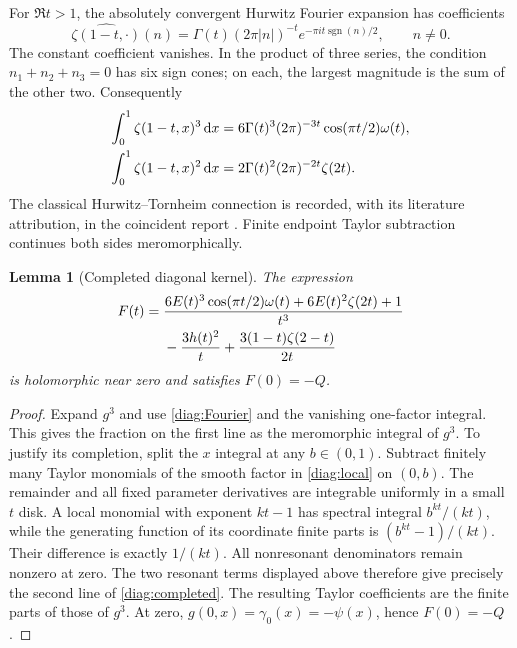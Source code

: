 \documentclass[11pt]{article}
\numberwithin{equation}{section}
\newtheorem{lemma}[theorem]{Lemma}
\theoremstyle{definition}
\theoremstyle{remark}
\newcommand{\dd}{\,\mathrm d}
\begin{document}
For $\Re t>1$, the absolutely convergent Hurwitz Fourier expansion
has coefficients
\[
 \widehat{\zeta(1-t,\cdot)}(n)
 =\Gamma(t)(2\pi|n|)^{-t}
             e^{-\pi i t\operatorname{sgn}(n)/2},\qquad n\ne0.
\]
The constant coefficient vanishes. In the product of three series,
the condition $n_1+n_2+n_3=0$ has six sign cones; on each, the
largest magnitude is the sum of the other two. Consequently
\begin{align}
 \int_0^1\zeta(1-t,x)^3\dd x
 &=6\Gamma(t)^3(2\pi)^{-3t}\cos(\pi t/2)\omega(t),\notag\\
 \int_0^1\zeta(1-t,x)^2\dd x
 &=2\Gamma(t)^2(2\pi)^{-2t}\zeta(2t).
 \label{diag:Fourier}
\end{align}
The classical Hurwitz--Tornheim connection is recorded, with its
literature attribution, in the coincident report
\cite{IncomingCoincident}. Finite endpoint Taylor subtraction
continues both sides meromorphically.

\begin{lemma}[Completed diagonal kernel]\label{lem:diag-completed}
The expression
\begin{align}
 F(t)={}&\frac{6E(t)^3\cos(\pi t/2)\omega(t)
                         +6E(t)^2\zeta(2t)+1}{t^3}\notag\\
 &-\frac{3h(t)^2}{t}
           +\frac{3(1-t)\zeta(2-t)}{2t}
 \label{diag:completed}
\end{align}
is holomorphic near zero and satisfies $F(0)=-Q$.
\end{lemma}

\begin{proof}
Expand $g^3$ and use \eqref{diag:Fourier} and the vanishing
one-factor integral. This gives the fraction on the first line as
the meromorphic integral of $g^3$. To justify its completion,
split the $x$ integral at any $b\in(0,1)$. Subtract finitely many
Taylor monomials of the smooth factor in \eqref{diag:local} on
$(0,b)$. The remainder and all fixed parameter derivatives are
integrable uniformly in a small $t$ disk. A local monomial with
exponent $kt-1$ has spectral integral $b^{kt}/(kt)$, while the
generating function of its coordinate finite parts is
$(b^{kt}-1)/(kt)$. Their difference is exactly $1/(kt)$.
All nonresonant denominators remain nonzero at zero. The two
resonant terms displayed above therefore give precisely the second
line of \eqref{diag:completed}. The resulting Taylor coefficients
are the finite parts of those of $g^3$. At zero,
$g(0,x)=\gamma_0(x)=-\psi(x)$, hence $F(0)=-Q$.
\end{proof}
\end{document}
